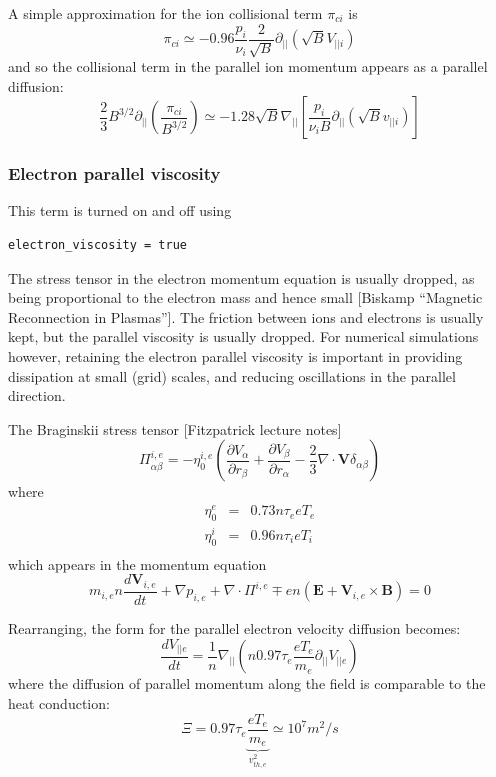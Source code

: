 \documentclass[12pt,a4paper]{article}
\begin{document}
A simple approximation for the ion collisional term $\pi_{ci}$ is
\begin{equation}
  \pi_{ci} \simeq -0.96\frac{p_i}{\nu_i}\frac{2}{\sqrt{B}}\partial_{||}\left(\sqrt{B}V_{||i}\right)
\end{equation}
and so the collisional term in the parallel ion momentum appears as a parallel diffusion:
\begin{equation}
\frac{2}{3}B^{3/2}\partial_{||}\left(\frac{\pi_{ci}}{B^{3/2}}\right) \simeq -1.28 \sqrt{B}\nabla_{||}\left[\frac{p_i}{\nu_i B}\partial_{||}\left(\sqrt{B}v_{||i}\right)\right]
\end{equation}


\subsubsection{Electron parallel viscosity}

This term is turned on and off using
\begin{verbatim}
electron_viscosity = true
\end{verbatim}

The stress tensor in the electron momentum equation is
usually dropped, as being proportional to the electron mass and hence
small [Biskamp ``Magnetic Reconnection in Plasmas'']. The friction
between ions and electrons is usually kept, but the parallel viscosity
is usually dropped. For numerical simulations however, retaining the
electron parallel viscosity is important in providing dissipation at small
(grid) scales, and reducing oscillations in the parallel direction.

The Braginskii stress tensor [Fitzpatrick lecture notes]
\[
\Pi_{\alpha\beta}^{i,e} = -\eta^{i,e}_0\left(\frac{\partial V_\alpha}{\partial r_\beta} + \frac{\partial V_\beta}{\partial r_\alpha} - \frac{2}{3}\nabla\cdot\mathbf{V}\delta_{\alpha\beta}\right)
\]
where
\begin{eqnarray*}
  \eta_0^e &=& 0.73 n \tau_e eT_e \\
  \eta_0^i &=& 0.96 n \tau_i eT_i \\
\end{eqnarray*}
which appears in the momentum equation
\[
m_{i,e}n\frac{d\mathbf{V}_{i,e}}{dt} + \nabla p_{i,e} + \nabla\cdot\Pi^{i,e} {\mp}en\left(\mathbf{E} + \mathbf{V}_{i,e}\times\mathbf{B}\right) = 0
\]

Rearranging, the form for the parallel electron velocity diffusion becomes:
\[
\frac{dV_{||e}}{dt} = \frac{1}{n}\nabla_{||}\left( n 0.97 \tau_e \frac{eT_e}{m_e} \partial_{||} V_{||e}\right)
\]
where the diffusion of parallel momentum along the field is comparable to the heat conduction:
\[
\Xi = 0.97 \tau_e \underbrace{\frac{eT_e}{m_e}}_{v_{th,e}^2} \simeq 10^{7} m^2/s
\]
\end{document}

